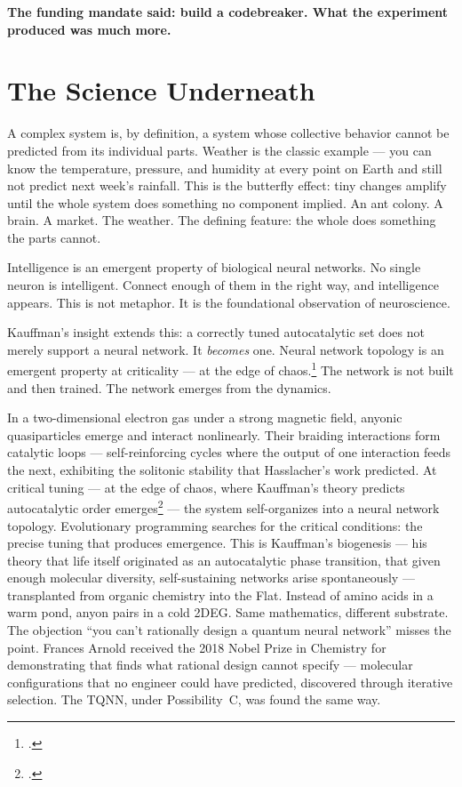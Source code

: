 \textbf{The funding mandate said: build a codebreaker. What the experiment produced was much more.}

\section*{The Science Underneath}
\label{demo:the-science-underneath}

A complex system is, by definition, a system whose collective behavior cannot be predicted from its individual parts. Weather is the classic example --- you can know the temperature, pressure, and humidity at every point on Earth and still not predict next week's rainfall. This is the butterfly effect: tiny changes amplify until the whole system does something no component implied. An ant colony. A brain. A market. The weather. The defining feature: the whole does something the parts cannot.

Intelligence is an emergent property of biological neural networks. No single neuron is intelligent. Connect enough of them in the right way, and intelligence appears. This is not metaphor. It is the foundational observation of neuroscience.

Kauffman's insight extends this: a correctly tuned autocatalytic set does not merely support a neural network. It \textit{becomes} one. Neural network topology is an emergent property at criticality --- at the edge of chaos.\footcite{kauffman1993} The network is not built and then trained. The network emerges from the dynamics.

In a two-dimensional electron gas under a strong magnetic field, anyonic quasiparticles emerge and interact nonlinearly. Their braiding interactions form catalytic loops --- self-reinforcing cycles where the output of one interaction feeds the next, exhibiting the solitonic stability that Hasslacher's work predicted. At critical tuning --- at the edge of chaos, where Kauffman's theory predicts autocatalytic order emerges\footcite{langton1990,kauffman1993} --- the system self-organizes into a neural network topology. Evolutionary programming searches for the critical conditions: the precise tuning that produces emergence. This is Kauffman's biogenesis --- his theory that life itself originated as an autocatalytic phase transition, that given enough molecular diversity, self-sustaining networks arise spontaneously --- transplanted from organic chemistry into the Flat. Instead of amino acids in a warm pond, anyon pairs in a cold 2DEG\@. Same mathematics, different substrate. The objection ``you can't rationally design a quantum neural network'' misses the point. Frances Arnold received the 2018 Nobel Prize in Chemistry for demonstrating that  finds what rational design cannot specify --- molecular configurations that no engineer could have predicted, discovered through iterative selection. The TQNN, under Possibility~C, was found the same way.

